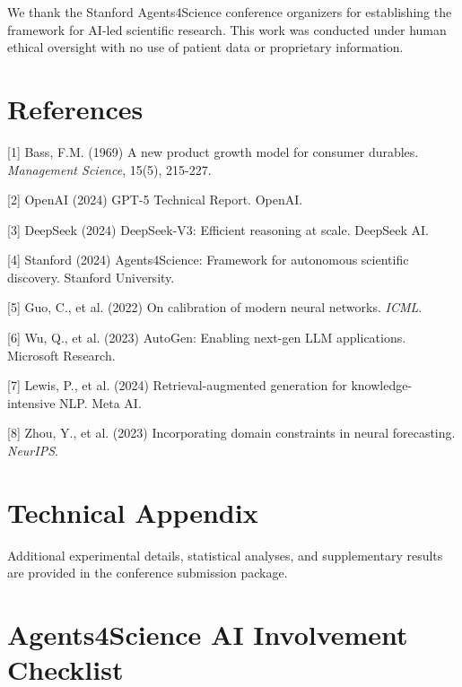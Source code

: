 \documentclass{article}
\begin{document}
\begin{ack}
We thank the Stanford Agents4Science conference organizers for establishing the framework for AI-led scientific research. This work was conducted under human ethical oversight with no use of patient data or proprietary information.
\end{ack}

\section*{References}

{\small
[1] Bass, F.M. (1969) A new product growth model for consumer durables. \textit{Management Science}, 15(5), 215-227.

[2] OpenAI (2024) GPT-5 Technical Report. OpenAI.

[3] DeepSeek (2024) DeepSeek-V3: Efficient reasoning at scale. DeepSeek AI.

[4] Stanford (2024) Agents4Science: Framework for autonomous scientific discovery. Stanford University.

[5] Guo, C., et al. (2022) On calibration of modern neural networks. \textit{ICML}.

[6] Wu, Q., et al. (2023) AutoGen: Enabling next-gen LLM applications. Microsoft Research.

[7] Lewis, P., et al. (2024) Retrieval-augmented generation for knowledge-intensive NLP. Meta AI.

[8] Zhou, Y., et al. (2023) Incorporating domain constraints in neural forecasting. \textit{NeurIPS}.
}

\appendix

\section{Technical Appendix}

Additional experimental details, statistical analyses, and supplementary results are provided in the conference submission package.

\newpage

\section*{Agents4Science AI Involvement Checklist}
\end{document}
